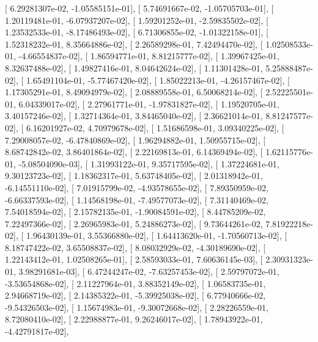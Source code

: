 \documentclass{article}
\begin{document}
       [  6.29281307e-02,  -1.05585151e-01],
       [  5.74691667e-02,  -1.05705703e-01],
       [  1.20119481e-01,  -6.07937207e-02],
       [  1.59201252e-01,  -2.59835502e-02],
       [  1.23532533e-01,  -8.17486493e-02],
       [  6.71306855e-02,  -1.01322158e-01],
       [  1.52318232e-01,   8.35664886e-02],
       [  2.26589298e-01,   7.42494470e-02],
       [  1.02508533e-01,  -4.66554837e-02],
       [  1.86594771e-01,   8.81215777e-02],
       [  1.39967425e-01,   8.32637488e-02],
       [  1.49827416e-01,   8.04642624e-02],
       [  1.11301428e-01,   5.25888487e-02],
       [  1.65491104e-01,  -5.77467420e-02],
       [  1.85022213e-01,  -4.26157467e-02],
       [  1.17305291e-01,   8.49094979e-02],
       [  2.08889558e-01,   6.50068214e-02],
       [  2.52225501e-01,   6.04339017e-02],
       [  2.27961771e-01,  -1.97831827e-02],
       [  1.19520705e-01,   3.40157246e-02],
       [  1.32714364e-01,   3.84465040e-02],
       [  2.36621014e-01,   8.81247577e-02],
       [  6.16201927e-02,   4.70979678e-02],
       [  1.51686598e-01,   3.09340225e-02],
       [  7.29008057e-02,  -6.47840869e-02],
       [  1.96294882e-01,   1.50955715e-02],
       [  8.68742842e-02,   3.86401864e-02],
       [  2.22169813e-01,   6.14369494e-02],
       [  1.62115776e-01,  -5.08504090e-03],
       [  1.31993122e-01,   9.35717595e-02],
       [  1.37224681e-01,   9.30123723e-02],
       [  1.18362317e-01,   5.63748405e-02],
       [  2.01318942e-01,  -6.14551110e-02],
       [  7.01915799e-02,  -4.93578655e-02],
       [  7.89350959e-02,  -6.66337593e-02],
       [  1.14568198e-01,  -7.49577073e-02],
       [  7.31140469e-02,   7.54018594e-02],
       [  2.15782135e-01,  -1.90084591e-02],
       [  8.44785209e-02,   7.22497366e-02],
       [  2.26965983e-01,   5.24886273e-02],
       [  9.73644261e-02,   7.81922218e-02],
       [  1.96430139e-01,   3.55366880e-02],
       [  1.64413620e-01,  -1.70560713e-02],
       [  8.18747422e-02,   3.65508837e-02],
       [  8.08032929e-02,  -4.30189690e-02],
       [  1.22143412e-01,   1.02508265e-01],
       [  2.58593033e-01,   7.60636145e-03],
       [  2.30931323e-01,   3.98291681e-03],
       [  6.47244247e-02,  -7.63257453e-02],
       [  2.59797072e-01,  -3.53654868e-02],
       [  2.11227964e-01,   3.88352149e-02],
       [  1.06583735e-01,   2.94668719e-02],
       [  2.14385322e-01,  -5.39925038e-02],
       [  6.77940666e-02,  -9.54326503e-02],
       [  1.15674983e-01,  -9.30072668e-02],
       [  2.28226559e-01,   8.72080410e-02],
       [  2.22988877e-01,   9.26246017e-02],
       [  1.78943922e-01,  -4.42791817e-02],
\end{document}
